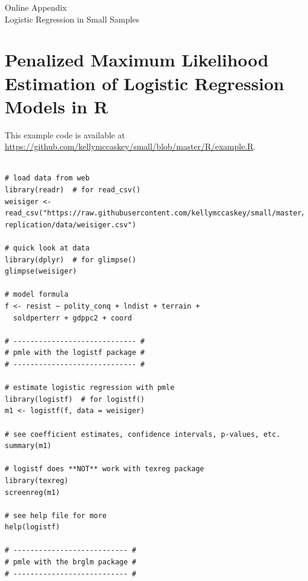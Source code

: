\documentclass[12pt]{article}
\begin{document}
\singlespace 
\newpage
\normalsize

%


\newpage
\begin{appendix}
\begin{center}
{\LARGE Online Appendix}\\
\vspace{3mm}
{\large Logistic Regression in Small Samples}\\\vspace{2mm}
\end{center}

\section{Penalized Maximum Likelihood Estimation of Logistic Regression Models in R}\label{sec:pmle-in-R}

This example code is available at \href{https://github.com/kellymccaskey/small/blob/master/R/example.R}{https://github.com/kellymccaskey/small/blob/master/R/example.R}.

\begin{footnotesize}
\begin{verbatim}

# load data from web
library(readr)  # for read_csv()
weisiger <- read_csv("https://raw.githubusercontent.com/kellymccaskey/small/master/weisiger-replication/data/weisiger.csv") 

# quick look at data
library(dplyr)  # for glimpse()
glimpse(weisiger)

# model formula
f <- resist ~ polity_conq + lndist + terrain + 
  soldperterr + gdppc2 + coord

# ----------------------------- #
# pmle with the logistf package #
# ----------------------------- #

# estimate logistic regression with pmle
library(logistf)  # for logistf()
m1 <- logistf(f, data = weisiger)

# see coefficient estimates, confidence intervals, p-values, etc.
summary(m1)

# logistf does **NOT** work with texreg package
library(texreg)
screenreg(m1)

# see help file for more
help(logistf)

# --------------------------- #
# pmle with the brglm package #
# --------------------------- #


\end{verbatim}
\end{footnotesize}
\end{appendix}
\end{document}

